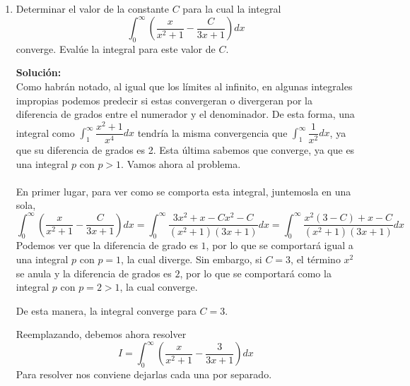 \documentclass[12pt]{article}
\newenvironment{solucion}
{\begin{mdframed}[backgroundcolor=black!10]
		{\bf Solución:}\\
	}
	{
	\end{mdframed}
}
\newenvironment{preguntas}
{\begin{enumerate}\itemsep12pt
	}
	{
	\end{enumerate}
}
\newcommand{\ev}{\Big|}
\begin{document}
\begin{preguntas}
\begin{solucion}
\begin{enumerate}[a)]
$$			= \pi \left(-\dfrac{1}{x}\ev_1^{\infty}\right)$$
			$$V = \pi$$
\end{enumerate}
\end{solucion}
\item Determinar el valor de la constante $C$ para la cual la integral
	$$\displaystyle\int_{0}^{\infty} \left( \dfrac{x}{x^2+1} - \dfrac{C}{3x+1}\right)dx$$
	converge. Evalúe la integral para este valor de $C$.
\begin{solucion}
Como habrán notado, al igual que los límites al infinito, en algunas integrales impropias podemos predecir si estas convergeran o divergeran por la diferencia de grados entre el numerador y el denominador. De esta forma, una integral como $\displaystyle\int_1^{\infty} \dfrac{x^2+1}{x^4}dx$ tendría la misma convergencia que $\displaystyle\int_1^{\infty} \dfrac{1}{x^2}dx$, ya que su diferencia de grados es 2. Esta última sabemos que converge, ya que es una integral $p$ con $p>1$. Vamos ahora al problema.\\
		\\
		En primer lugar, para ver como se comporta esta integral, juntemosla en una sola,
		\small$$\displaystyle\int_{0}^{\infty} \left( \dfrac{x}{x^2+1} - \dfrac{C}{3x+1}\right)dx
		= \displaystyle\int_{0}^{\infty} \dfrac{3x^2+x-Cx^2-C}{(x^2+1)(3x+1)}dx
		= \displaystyle\int_{0}^{\infty} \dfrac{x^2(3-C) + x - C}{(x^2+1)(3x+1)}dx$$
		Podemos ver que la diferencia de grado es $1$, por lo que se comportará igual a una integral $p$ con $p=1$, la cual diverge. Sin embargo, si $C=3$, el término $x^2$ se anula y la diferencia de grados es $2$, por lo que se comportará como la integral $p$ con $p=2>1$, la cual converge.
		
		De esta manera, la integral converge para $C=3$.
		
		Reemplazando, debemos ahora resolver
		$$I = \displaystyle\int_{0}^{\infty} \left( \dfrac{x}{x^2+1} - \dfrac{3}{3x+1}\right)dx$$
		Para resolver nos conviene dejarlas cada una por separado.
		

\end{solucion}
\end{preguntas}
\end{document}
